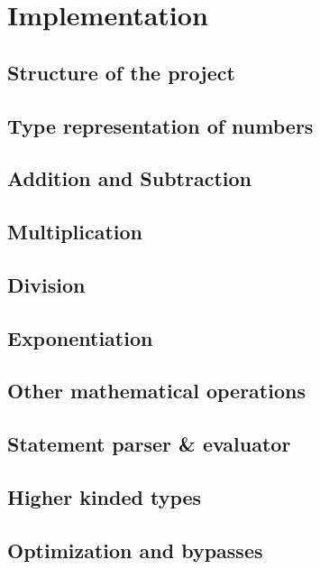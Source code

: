 \chapter{Implementation}

\section{Structure of the project}
\section{Type representation of numbers}
\section{Addition and Subtraction}
\section{Multiplication}
\section{Division}
\section{Exponentiation}
\section{Other mathematical operations}
\section{Statement parser \& evaluator}
\section{Higher kinded types}
\section{Optimization and bypasses}